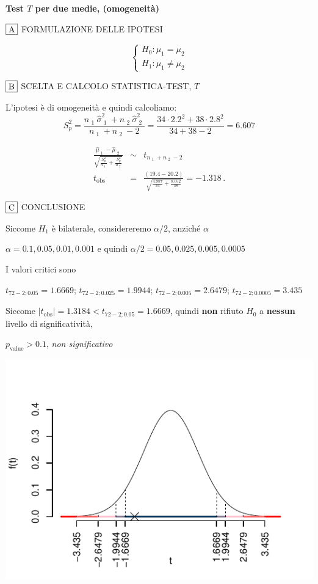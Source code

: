 \documentclass[
  11pt,
]{book}
\theoremstyle{mytheoremstyle}
\theoremstyle{mydefstyle}
\newenvironment{sol}
  {
  \begin{tcolorbox}[enhanced,breakable,arc=0.1mm,boxrule=1pt,colback=white,colframe=iblue,
  title=\bf \fontfamily{lmss}\selectfont \hspace{.5 cm} Soluzione,drop fuzzy shadow]

}{
\end{tcolorbox}
  }
\begin{document}
\begin{sol}
\textbf{Test \(T\) per due medie, (omogeneità)}

\(\fbox{A}\) FORMULAZIONE DELLE IPOTESI

\[\begin{cases}
   H_0: \mu_\text{1} = \mu_\text{2} \\
   H_1: \mu_\text{1} \neq \mu_\text{2} 
   \end{cases}\]

\(\fbox{B}\) SCELTA E CALCOLO STATISTICA-TEST, \(T\)

L'ipotesi è di omogeneità e quindi calcoliamo:\[
   S_p^2=\frac{n_\text{ 1 }\hat\sigma^2_\text{ 1 }+n_\text{ 2 }\hat\sigma^2_\text{ 2 }}{n_\text{ 1 }+n_\text{ 2 }-2} =
   \frac{ 34 \cdot 2.2 ^2+ 38 \cdot 2.8 ^2}{ 34 + 38 -2}= 6.607 
  \]

\begin{eqnarray*}
  \frac{\hat\mu_\text{ 1 } - \hat\mu_\text{ 2 }}
  {\sqrt{\frac {S^2_p}{n_\text{ 1 }}+\frac {S^2_p}{n_\text{ 2 }}}}&\sim&t_{n_\text{ 1 }+n_\text{ 2 }-2}\\
  t_{\text{obs}}
  &=& \frac{ ( 19.4 -  20.2 )} {\sqrt{\frac{ 4.987 }{ 34 }+\frac{ 8.052 }{ 38 }}}
  =   -1.318 \, .
  \end{eqnarray*}

\(\fbox{C}\) CONCLUSIONE

Siccome \(H_1\) è bilaterale, considereremo \(\alpha/2\),
anziché \(\alpha\)

\(\alpha=0.1, 0.05, 0.01, 0.001\) e quindi \(\alpha/2=0.05, 0.025, 0.005, 0.0005\)

I valori critici sono

\(t_{72-2;0.05}=1.6669\); \(t_{72-2;0.025}=1.9944\); \(t_{72-2;0.005}=2.6479\); \(t_{72-2;0.0005}=3.435\)

Siccome \(|t_\text{obs}|=1.3184<t_{72-2;0.05}=1.6669\), quindi \textbf{non} rifiuto \(H_0\) a \textbf{nessun} livello di significatività,

\(p_\text{value}>0.1\), \emph{non significativo}

\begin{center}\includegraphics{Esami_passati_con_soluzioni_files/figure-latex/2022-47-1} \end{center}


\end{sol}
\end{document}
